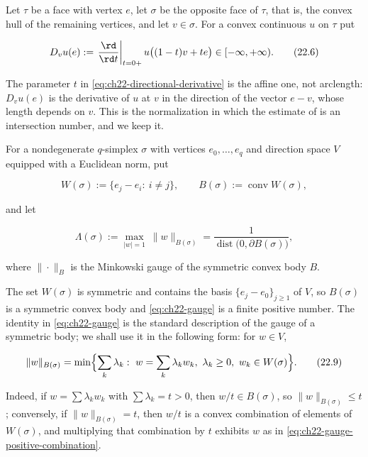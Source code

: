 \begin{definition}
\label{def:ch22-directional-derivative}
Let $\tau$ be a face with vertex $e$, let $\sigma$ be the opposite
face of $\tau$, that is, the convex hull of the remaining vertices, and
let $v\in\sigma$.  For a convex continuous $u$ on $\tau$ put

\[
 D_v u(e)
   :=\left.\frac{\rd}{\rd t}\right|_{t=0+}
      u\bigl((1-t)v+te\bigr)\in[-\infty,+\infty).
\tag{22.6}\label{eq:ch22-directional-derivative}
\]
\end{definition}

The parameter $t$ in \eqref{eq:ch22-directional-derivative} is the affine
one, not arclength: $D_vu(e)$ is the derivative of $u$ at $v$ in the
direction of the vector $e-v$, whose length depends on $v$.  This is the
normalization in which the estimate of  is an
intersection number, and we keep it.

\begin{definition}
\label{def:ch22-simplex-gauge}
For a nondegenerate $q$-simplex $\sigma$ with vertices
$e_0,\ldots,e_q$ and direction space $V$ equipped with a Euclidean norm,
put

\[
 W(\sigma):=\{e_j-e_i:\ i\neq j\},
 \qquad
 B(\sigma):=\operatorname{conv}W(\sigma),
\tag{22.7}\label{eq:ch22-gauge-body}
\]

and let

\[
 \Lambda(\sigma)
   :=\max_{|w|=1}\ \|w\|_{B(\sigma)}
   =\frac1{\operatorname{dist}\bigl(0,\partial B(\sigma)\bigr)},
\tag{22.8}\label{eq:ch22-gauge}
\]

where $\|\cdot\|_{B}$ is the Minkowski gauge of the symmetric convex body
$B$.
\end{definition}

The set $W(\sigma)$ is symmetric and contains the basis
$\{e_j-e_0\}_{j\geq1}$ of $V$, so $B(\sigma)$ is a symmetric convex
body and \eqref{eq:ch22-gauge} is a finite positive number.  The identity in
\eqref{eq:ch22-gauge} is the standard description of the gauge of a
symmetric body; we shall use it in the following form: for $w\in V$,

\[
 \|w\|_{B(\sigma)}
 =\min\Bigl\{\sum_k\lambda_k:\ w=\sum_k\lambda_kw_k,\
       \lambda_k\geq0,\ w_k\in W(\sigma)\Bigr\}.
\tag{22.9}\label{eq:ch22-gauge-positive-combination}
\]

Indeed, if $w=\sum\lambda_kw_k$ with $\sum\lambda_k=t>0$, then
$w/t\in B(\sigma)$, so $\|w\|_{B(\sigma)}\leq t$; conversely, if
$\|w\|_{B(\sigma)}=t$, then $w/t$ is a convex combination of elements of
$W(\sigma)$, and multiplying that combination by $t$ exhibits $w$ as
in \eqref{eq:ch22-gauge-positive-combination}.

